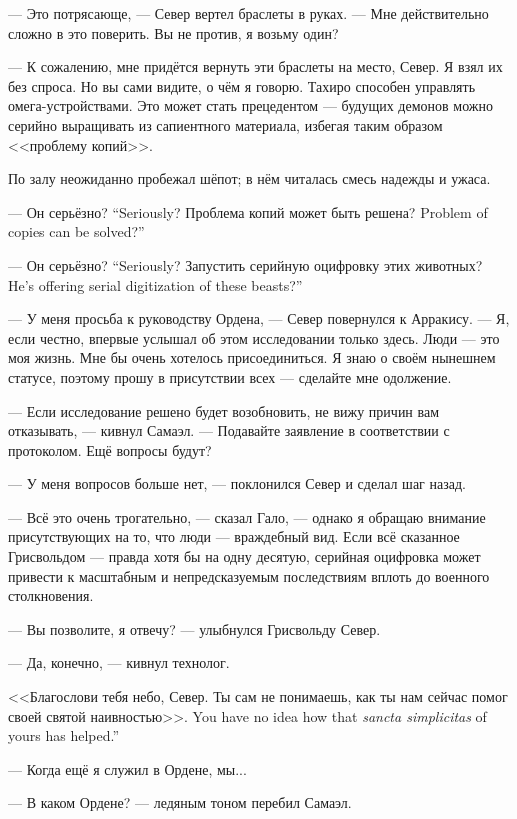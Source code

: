 --- Это потрясающе, --- Север вертел браслеты в руках.
--- Мне действительно сложно в это поверить.
Вы не против, я возьму один?

--- К сожалению, мне придётся вернуть эти браслеты на место, Север.
Я взял их без спроса.
Но вы сами видите, о чём я говорю.
Тахиро способен управлять омега-устройствами.
Это может стать прецедентом --- будущих демонов можно серийно выращивать из сапиентного материала, избегая таким образом <<проблему копий>>.

По залу неожиданно пробежал шёпот;
в нём читалась смесь надежды и ужаса.

{--- Он серьёзно?}
{``Seriously?}
{Проблема копий может быть решена?}
{Problem of copies can be solved?''}

{--- Он серьёзно?}
{``Seriously?}
{Запустить серийную оцифровку этих животных?}
{He's offering serial digitization of these beasts?''}

--- У меня просьба к руководству Ордена, --- Север повернулся к Арракису.
--- Я, если честно, впервые услышал об этом исследовании только здесь.
Люди --- это моя жизнь.
Мне бы очень хотелось присоединиться.
Я знаю о своём нынешнем статусе, поэтому прошу в присутствии всех --- сделайте мне одолжение.

--- Если исследование решено будет возобновить, не вижу причин вам отказывать, --- кивнул Самаэл.
--- Подавайте заявление в соответствии с протоколом.
Ещё вопросы будут?

--- У меня вопросов больше нет, --- поклонился Север и сделал шаг назад.

--- Всё это очень трогательно, --- сказал Гало, --- однако я обращаю внимание присутствующих на то, что люди --- враждебный вид.
Если всё сказанное Грисвольдом --- правда хотя бы на одну десятую, серийная оцифровка может привести к масштабным и непредсказуемым последствиям вплоть до военного столкновения.

--- Вы позволите, я отвечу? --- улыбнулся Грисвольду Север.

--- Да, конечно, --- кивнул технолог.

<<Благослови тебя небо, Север.
{Ты сам не понимаешь, как ты нам сейчас помог своей святой наивностью>>.}
{You have no idea how that \textit{sancta simplicitas} of yours has helped.''}

--- Когда ещё я служил в Ордене, мы...

--- В каком Ордене? --- ледяным тоном перебил Самаэл.

